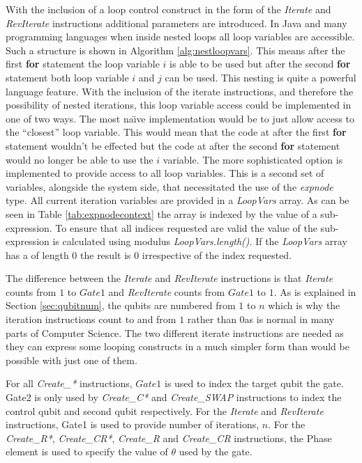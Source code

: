 With the inclusion of a loop control construct in the form of the \emph{Iterate} and \emph{RevIterate} instructions additional parameters are introduced.
In Java and many programming languages when inside nested loops all loop variables are accessible.
Such a structure is shown in Algorithm \ref{alg:nestloopvars}.
This means after the first \textbf{for} statement the loop variable $i$ is able to be used but after the second \textbf{for} statement both loop variable $i$ and $j$ can be used.
This nesting is quite a powerful language feature.
With the inclusion of the iterate instructions, and therefore the possibility of nested iterations, this loop variable access could be implemented in one of two ways.
The most na\"{\i}ve implementation would be to just allow access to the ``closest'' loop variable.
This would mean that the code at after the first \textbf{for} statement wouldn't be effected but the code at after the second \textbf{for} statement would no longer be able to use the $i$ variable.
The more sophisticated option is implemented to provide access to all loop variables.
This is a second set of variables, alongside the system side, that necessitated the use of the \emph{expnode} type.
All current iteration variables are provided in a \emph{LoopVars} array.
As can be seen in Table \ref{tab:expnodecontext} the array is indexed by the value of a sub-expression.
To ensure that all indices requested are valid the value of the sub-expression is calculated using modulus \emph{LoopVars.length()}.
If the \emph{LoopVars} array has a of length $0$ the result is $0$ irrespective of the index requested.

The difference between the \emph{Iterate} and \emph{RevIterate} instructions is that \emph{Iterate} counts from $1$ to $Gate1$ and \emph{RevIterate} counts from $Gate1$ to $1$.
As is explained in Section \ref{sec:qubitnum}, the qubits are numbered from $1$ to $n$ which is why the iteration instructions count to and from $1$ rather than $0$as is normal in many parts of Computer Science.
The two different iterate instructions are needed as they can express some looping constructs in a much simpler form than would be possible with just one of them.

For all \emph{Create\_*} instructions, $Gate1$ is used to index the target qubit the gate.
Gate2 is only used by \emph{Create\_C*} and \emph{Create\_SWAP} instructions to index the control qubit and second qubit respectively.
For the \emph{Iterate} and \emph{RevIterate} instructions, Gate1 is used to provide number of iterations, $n$.
For the \emph{Create\_R*}, \emph{Create\_CR*}, \emph{Create\_R} and  \emph{Create\_CR} instructions, the Phase element is used to specify the value of $\theta$ used by the gate.

